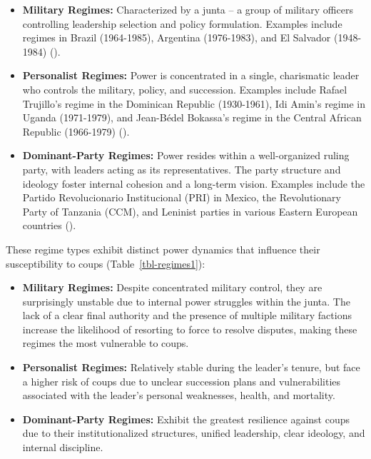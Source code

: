 \documentclass[
  12pt,
]{report}
\begin{document}
\begin{itemize}
\item
  \textbf{Military Regimes:} Characterized by a junta -- a group of
  military officers controlling leadership selection and policy
  formulation. Examples include regimes in Brazil (1964-1985), Argentina
  (1976-1983), and El Salvador (1948-1984)
  ().
\item
  \textbf{Personalist Regimes:} Power is concentrated in a single,
  charismatic leader who controls the military, policy, and succession.
  Examples include Rafael Trujillo's regime in the Dominican Republic
  (1930-1961), Idi Amin's regime in Uganda (1971-1979), and Jean-Bédel
  Bokassa's regime in the Central African Republic (1966-1979)
  ().
\item
  \textbf{Dominant-Party Regimes:} Power resides within a well-organized
  ruling party, with leaders acting as its representatives. The party
  structure and ideology foster internal cohesion and a long-term
  vision. Examples include the Partido Revolucionario Institucional
  (PRI) in Mexico, the Revolutionary Party of Tanzania (CCM), and
  Leninist parties in various Eastern European countries
  ().
\end{itemize}

These regime types exhibit distinct power dynamics that influence their
susceptibility to coups (Table~\ref{tbl-regimes1}):

\begin{itemize}
\item
  \textbf{Military Regimes:} Despite concentrated military control, they
  are surprisingly unstable due to internal power struggles within the
  junta. The lack of a clear final authority and the presence of
  multiple military factions increase the likelihood of resorting to
  force to resolve disputes, making these regimes the most vulnerable to
  coups.
\item
  \textbf{Personalist Regimes:} Relatively stable during the leader's
  tenure, but face a higher risk of coups due to unclear succession
  plans and vulnerabilities associated with the leader's personal
  weaknesses, health, and mortality.
\item
  \textbf{Dominant-Party Regimes:} Exhibit the greatest resilience
  against coups due to their institutionalized structures, unified
  leadership, clear ideology, and internal discipline.
\end{itemize}
\end{document}
